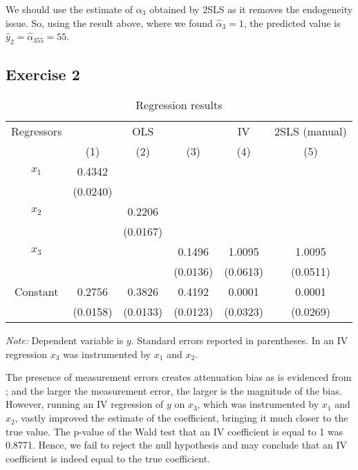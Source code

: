 \documentclass[]{article}
\begin{document}
\subsubsection{}
We should use the estimate of $\alpha_3$ obtained by 2SLS as it removes the endogeneity issue. So, using the result above, where we found $\hat{\alpha}_3 = 1$, the predicted value is $\hat{y}_2 = \hat{\alpha}_355 = 55$. 

\subsection*{Exercise 2}
\begin{table}[h]
	\begin{center}
		\begin{threeparttable}
			\begin{tabular}{c|ccccc}
				Regressors & \multicolumn{3}{c}{OLS} & IV & 2SLS (manual) \\
						& (1) 		& (2) 		& (3) 		& (4) 		& (5) 		\\ \hline
				$x_1$ 	& 0.4342 	&  			&  			&  			&  			\\
						& (0.0240) 	& 			&  			&  			&  			\\
				$x_2$ 	&  			& 0.2206 	&  			&  			&  			\\
						&  			& (0.0167) 	&  			&  			&  			\\
				$x_3$ 	&  			&  			& 0.1496 	& 1.0095 	& 1.0095 	\\
						&			&  			& (0.0136) 	& (0.0613) 	& (0.0511) 	\\
				Constant& 0.2756 	& 0.3826 	& 0.4192 	& 0.0001 	& 0.0001 	\\
						& (0.0158) 	& (0.0133) 	& (0.0123) 	& (0.0323) 	& (0.0269) 
			\end{tabular}
			\begin{tablenotes}
				\textit{Note: }Dependent variable is $y$. Standard errors reported in parentheses. In an IV regression $x_3$ was instrumented by $x_1$ and $x_2$.
			\end{tablenotes}
		\end{threeparttable}
	\end{center}
	\caption{Regression results}
	\label{tab:ex2regres}
\end{table}

The presence of measurement errors creates attenuation bias as is evidenced from ; and the larger the measurement error, the larger is the magnitude of the bias. However, running an IV regression of $y$ on $x_3$, which was instrumented by $x_1$ and $x_2$, vastly improved the estimate of the coefficient, bringing it much closer to the true value. The p-value of the Wald test that an IV coefficient is equal to 1 was 0.8771. Hence, we fail to reject the null hypothesis and may conclude that an IV coefficient is indeed equal to the true coefficient.
\end{document}
